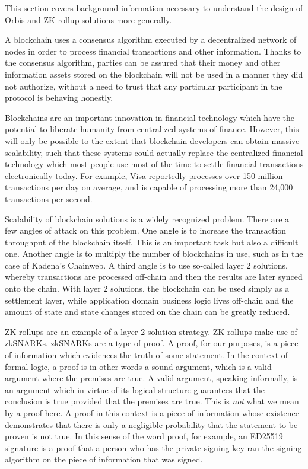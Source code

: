 \documentclass[12pt]{article}
\begin{document}
This section covers background information necessary to understand the design of Orbis and ZK rollup solutions more generally.

A blockchain uses a consensus algorithm executed by a decentralized network of nodes in order to process financial transactions and other information. Thanks to the consensus algorithm, parties can be assured that their money and other information assets stored on the blockchain will not be used in a manner they did not authorize, without a need to trust that any particular participant in the protocol is behaving honestly.

Blockchains are an important innovation in financial technology which have the potential to liberate humanity from centralized systems of finance. However, this will only be possible to the extent that blockchain developers can obtain massive scalability, such that these systems could actually replace the centralized financial technology which most people use most of the time to settle financial transactions electronically today. For example, Visa reportedly processes over 150 million transactions per day on average, and is capable of processing more than 24,000 transactions per second. \cite{visa}

Scalability of blockchain solutions is a widely recognized problem. There are a few angles of attack on this problem. One angle is to increase the transaction throughput of the blockchain itself. This is an important task but also a difficult one. Another angle is to multiply the number of blockchains in use, such as in the case of Kadena's Chainweb. \cite{chainweb} A third angle is to use so-called layer 2 solutions, whereby transactions are processed off-chain and then the results are later synced onto the chain. With layer 2 solutions, the blockchain can be used simply as a settlement layer, while application domain business logic lives off-chain and the amount of state and state changes stored on the chain can be greatly reduced.

ZK rollups are an example of a layer 2 solution strategy. ZK rollups make use of zkSNARKs. zkSNARKs are a type of proof. A proof, for our purposes, is a piece of information which evidences the truth of some statement. In the context of formal logic, a proof is in other words a sound argument, which is a valid argument where the premises are true. A valid argument, speaking informally, is an argument which in virtue of its logical structure guarantees that the conclusion is true provided that the premises are true. This is \emph{not}\/ what we mean by a proof here. A proof in this context is a piece of information whose existence demonstrates that there is only a negligible probability that the statement to be proven is not true. In this sense of the word proof, for example, an ED25519 signature is a proof that a person who has the private signing key ran the signing algorithm on the piece of information that was signed.
\end{document}
